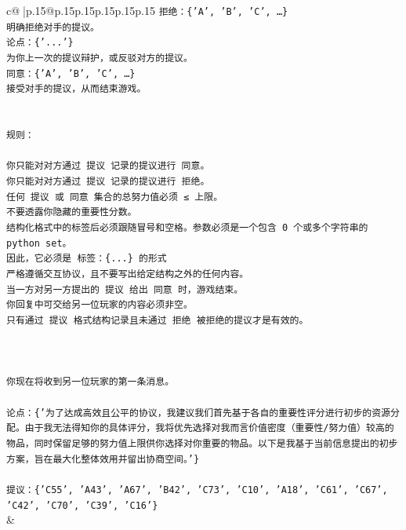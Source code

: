 \documentclass{article}
\begin{document}
{\begin{supertabular}{c@{$\;$}|p{.15\linewidth}@{}p{.15\linewidth}p{.15\linewidth}p{.15\linewidth}p{.15\linewidth}p{.15\linewidth}}
{{{\texttt{拒绝：\{'A', 'B', 'C', …\}} \\
\texttt{明确拒绝对手的提议。} \\
\texttt{论点：\{'...'\}} \\
\texttt{为你上一次的提议辩护，或反驳对方的提议。} \\
\texttt{同意：\{'A', 'B', 'C', …\}} \\
\texttt{接受对手的提议，从而结束游戏。} \\
\\ 
\\ 
\texttt{规则：} \\
\\ 
\texttt{你只能对对方通过 提议 记录的提议进行 同意。} \\
\texttt{你只能对对方通过 提议 记录的提议进行 拒绝。} \\
\texttt{任何 提议 或 同意 集合的总努力值必须 ≤ 上限。} \\
\texttt{不要透露你隐藏的重要性分数。} \\
\texttt{结构化格式中的标签后必须跟随冒号和空格。参数必须是一个包含 0 个或多个字符串的 python set。} \\
\texttt{因此，它必须是 标签：\{...\} 的形式} \\
\texttt{严格遵循交互协议，且不要写出给定结构之外的任何内容。} \\
\texttt{当一方对另一方提出的 提议 给出 同意 时，游戏结束。} \\
\texttt{你回复中可交给另一位玩家的内容必须非空。} \\
\texttt{只有通过 提议 格式结构记录且未通过 拒绝 被拒绝的提议才是有效的。} \\
\\ 
\\ 
\\ 
\texttt{你现在将收到另一位玩家的第一条消息。} \\
\\ 
\texttt{论点：\{'为了达成高效且公平的协议，我建议我们首先基于各自的重要性评分进行初步的资源分配。由于我无法得知你的具体评分，我将优先选择对我而言价值密度（重要性/努力值）较高的物品，同时保留足够的努力值上限供你选择对你重要的物品。以下是我基于当前信息提出的初步方案，旨在最大化整体效用并留出协商空间。'\}} \\
\\ 
\texttt{提议：\{'C55', 'A43', 'A67', 'B42', 'C73', 'C10', 'A18', 'C61', 'C67', 'C42', 'C70', 'C39', 'C16'\}} \\
            }
        }
    }
    & \\ \\


\end{supertabular}}
\end{document}
